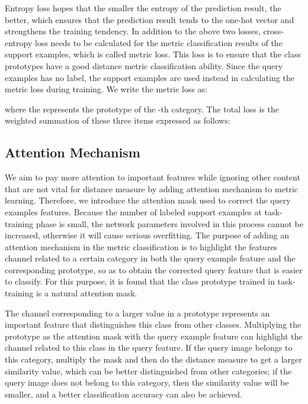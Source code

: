 \documentclass[conference]{IEEEtran}
\begin{document}
Entropy loss hopes that the smaller the entropy of the prediction result, the better, which ensures that the prediction result tends to the one-hot vector and strengthens the training tendency. In addition to the above two losses, cross-entropy loss needs to be calculated for the metric classification results of the support examples, which is called metric loss. This loss is to ensure that the class prototypes have a good distance metric classification ability. Since the query examples has no label, the support examples are used instead in calculating the metric loss during training. We write the metric loss as:


where the  represents the prototype of the -th category. The total loss is the weighted summation of these three items expressed as follows:



\subsection{Attention Mechanism}\label{3.4}
We aim to pay more attention to important features while ignoring other content that are not vital for distance measure by adding attention mechanism to metric learning. Therefore, we introduce the attention mask used to correct the query examples features. Because the number of labeled support examples at task-training phase is small, the network parameters involved in this process cannot be increased, otherwise it will cause serious overfitting. The purpose of adding an attention mechanism in the metric classification is to highlight the features channel related to a certain category in both the query example feature and the corresponding prototype, so as to obtain the corrected query feature that is easier to classify. For this purpose, it is found that the class prototype trained in task-training is a natural attention mask.

The channel corresponding to a larger value in a prototype represents an important feature that distinguishes this class from other classes. Multiplying the prototype as the attention mask with the query example feature can highlight the channel related to this class in the query feature. If the query image belongs to this category, multiply the mask and then do the distance measure to get a larger similarity value, which can be better distinguished from other categories; if the query image does not belong to this category, then the similarity value will be smaller, and a better classification accuracy can also be achieved.
\end{document}
